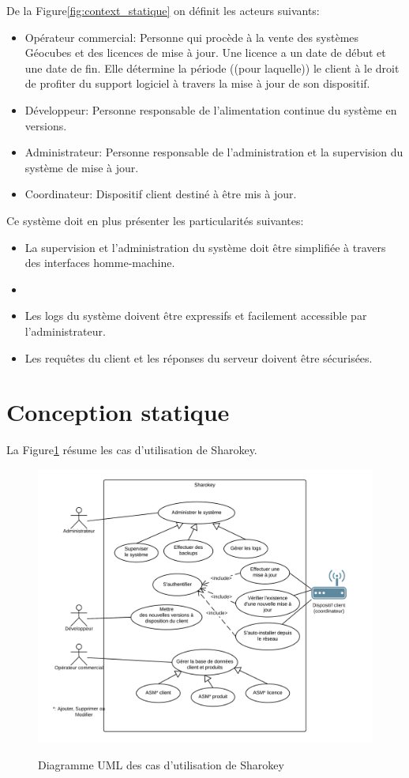 \documentclass{themeensg}
\begin{document}
De la Figure\ref{fig:context_statique} on définit les acteurs suivants:
\begin{itemize}
\item Opérateur commercial: Personne qui procède à la vente des systèmes Géocubes et des licences de mise à jour. Une licence a un date de début et une date de fin. Elle détermine la période ((pour laquelle)) le client à le droit de profiter du support logiciel à travers la mise à jour de son dispositif.
\item Développeur: Personne responsable de l'alimentation continue du système en versions.
\item Administrateur: Personne responsable de l'administration et la supervision du système de mise à jour.
\item Coordinateur: Dispositif client destiné à être mis à jour.
\end{itemize}

Ce système doit en plus présenter les particularités suivantes:
\begin{itemize}
\item La supervision et l'administration du système doit être simplifiée à travers des interfaces homme-machine.
\item 
\item Les logs du système doivent être expressifs et facilement accessible par l'administrateur.
\item Les requêtes du client et les réponses du serveur doivent être sécurisées.
\end{itemize}

\section{Conception statique}
La Figure\ref{fig:use_case} résume les cas d'utilisation de Sharokey.

\begin{figure}[h!]
\centering
\includegraphics[scale=1]{images/use_case_sharokey.png}
\label{fig:use_case}
\caption{Diagramme UML des cas d'utilisation de Sharokey}
\end{figure}
\end{document}
